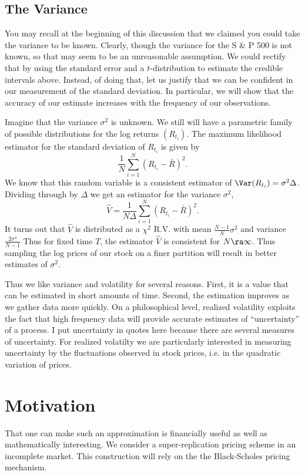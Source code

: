 \documentclass{report}
\begin{document}
\subsection{The Variance}

You may recall at the beginning of this discussion that we claimed you
could take the variance to be known.  Clearly, though the variance for
the S \& P 500 is not known, so that may seem to be an unreasonable
assumption.  We could rectify that by using the standard error and a
$t$-distribution to estimate the credible intervals above.  Instead,
of doing that, let us justify that we can be confident in our
measurement of the standard deviation.  In particular, we will show
that the accuracy of our estimate increases with the frequency of our
observations.  

Imagine that the variance $\sigma^2$ is unknown.  We still will have a
parametric family of possible distributions for the log returns
$(R_{t_i})$.  The maximum likelihood estimator for the standard
deviation of $R_{t_i}$ is given by
\[
\frac{1}{N} \sum_{i=1}^N (R_{t_i} - \bar R)^2.
\]
We know that this random variable is a consistent estimator of
$\Var(R_{t_i}) = \sigma^2 \Delta$.  Dividing through by $\Delta$ we
get an estimator for the variance $\sigma^2$,
\[
\hat V = \frac{1}{N \Delta} \sum_{i=1}^N(R_{t_i} - \bar R)^2.
\]
It turns out that $\hat V$ is distributed as a $\chi^2$ R.V. with mean
$\frac{N-1}{N} \sigma^2$ and variance $\frac{2 \sigma^4}{N-1}$  Thus
for fixed time $T$, the estimator $\hat V$ is consistent for $N \ra
\infty$.  Thus sampling the log prices of our stock on a finer
partition will result in better estimates of $\sigma^2$.

Thus we like variance and volatility for several reasons.  First, it
is a value that can be estimated in short amounts of time.  Second,
the estimation improves as we gather data more quickly.  On a
philosophical level, realized volatility exploits the fact that high
frequency data will provide accurate estimates of ``uncertainty'' of a
process.  I put uncertainty in quotes here because there are several
measures of uncertainty.  For realized volatilty we are particularly
interested in measuring uncertainty by the fluctuations observed in
stock prices, i.e. in the quadratic variation of prices.

\section{Motivation}

That one can make such an approximation is financially useful as well
as
mathematically interesting.  We consider a super-replication pricing
scheme in an incomplete market.  This construction will rely on the
the Black-Scholes pricing mechanism.  
\end{document}
